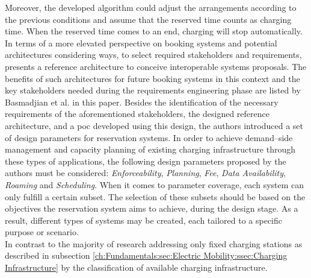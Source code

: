 Moreover, the developed algorithm could adjust the arrangements according to the previous conditions and assume that the reserved time counts as charging time. When the reserved time comes to an end, charging will stop automatically. \\
\noindent In terms of a more elevated perspective on booking systems and potential architectures considering ways, to select required stakeholders and requirements, \cite{basmadjian_reference_2020} presents a reference architecture to conceive interoperable systems proposals.
The benefits of such architectures for future booking systems in this context and the key stakeholders needed during the requirements engineering phase are listed by Basmadjian et al. in this paper.
Besides the identification of the necessary requirements of the aforementioned stakeholders, the designed reference architecture, and a \acrshort{poc} developed using this design, the authors introduced a set of design parameters for reservation systems.
In order to achieve demand--side management and capacity planning of existing charging infrastructure through these types of applications, the following design parameters proposed by the authors must be considered: \textit{Enforceability}, \textit{Planning}, \textit{Fee}, \textit{Data Availability}, \textit{Roaming} and \textit{Scheduling}.
When it comes to parameter coverage, each system can only fulfill a certain subset. The selection of these subsets should be based on the objectives the reservation system aims to achieve, during the design stage.
As a result, different types of systems may be created, each tailored to a specific purpose or scenario. \\
\noindent In contrast to the majority of research addressing only fixed charging stations as described in subsection \ref{ch:Fundamentals:sec:Electric Mobility:ssec:Charging Infrastructure} by the classification of available charging infrastructure. 
